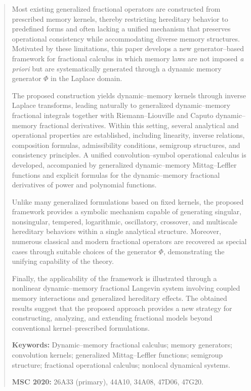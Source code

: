 \documentclass[11pt]{article}
\numberwithin{equation}{section}
\begin{document}
\begin{abstract}
Most existing generalized fractional operators are constructed from prescribed memory kernels, thereby restricting hereditary behavior to predefined forms and often lacking a unified mechanism that preserves operational consistency while accommodating diverse memory structures. Motivated by these limitations, this paper develops a new generator--based framework for fractional calculus in which memory laws are not imposed \emph{a priori} but are systematically generated through a dynamic memory generator $\Phi$ in the Laplace domain.

The proposed construction yields dynamic--memory kernels through inverse Laplace transforms, leading naturally to generalized dynamic--memory fractional integrals together with Riemann--Liouville and Caputo dynamic--memory fractional derivatives. Within this setting, several analytical and operational properties are established, including linearity, inverse relations, composition formulas, admissibility conditions, semigroup structures, and consistency principles. A unified convolution--symbol operational calculus is developed, accompanied by generalized dynamic--memory Mittag--Leffler functions and explicit formulas for the dynamic--memory fractional derivatives of power and polynomial functions.

Unlike many generalized formulations based on fixed kernels, the proposed framework provides a symbolic mechanism capable of generating singular, nonsingular, tempered, logarithmic, oscillatory, crossover, and multiscale hereditary behaviors within a single analytical structure. Moreover, numerous classical and modern fractional operators are recovered as special cases through suitable choices of the generator $\Phi$, demonstrating the unifying capability of the theory.

Finally, the applicability of the framework is illustrated through a nonlinear dynamic--memory fractional Langevin system involving coupled memory interactions and generalized hereditary effects. The obtained results suggest that the proposed approach provides a new strategy for constructing, analyzing, and extending fractional models beyond conventional kernel--prescribed formulations.
\medskip

\noindent
\textbf{Keywords:}
Dynamic--memory fractional calculus;
memory generators;
convolution kernels;
generalized Mittag--Leffler functions;
semigroup structure;
fractional operational calculus;
nonlocal dynamical systems.

\noindent
\textbf{MSC 2020:}
26A33 (primary), 44A10, 34A08, 47D06, 47G20.

\end{abstract}
\end{document}
